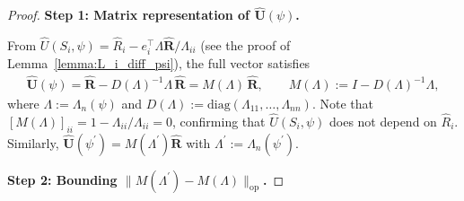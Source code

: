 \begin{proof}
\noindent\textbf{Step 1: Matrix representation of $\widehat{\mathbf{U}}(\psi)$.}

From $\widehat U(S_i,\psi)=\widehat R_i - e_i^\top\Lambda\widehat{\mathbf{R}}/\Lambda_{ii}$ (see the proof of Lemma~\ref{lemma:L_i_diff_psi}), the full vector satisfies
\begin{align*}
\widehat{\mathbf{U}}(\psi) = \widehat{\mathbf{R}} - D(\Lambda)^{-1}\Lambda\,\widehat{\mathbf{R}} = M(\Lambda)\,\widehat{\mathbf{R}},
\qquad M(\Lambda):=I - D(\Lambda)^{-1}\Lambda,
\end{align*}
where $\Lambda:=\Lambda_n(\psi)$ and $D(\Lambda):=\mathrm{diag}(\Lambda_{11},\ldots,\Lambda_{nn})$.  Note that $[M(\Lambda)]_{ii}=1-\Lambda_{ii}/\Lambda_{ii}=0$, confirming that $\widehat U(S_i,\psi)$ does not depend on $\widehat{R}_i$.  Similarly, $\widehat{\mathbf{U}}(\psi^\prime)=M(\Lambda^\prime)\widehat{\mathbf{R}}$ with $\Lambda^\prime:=\Lambda_n(\psi^\prime)$.

\noindent\textbf{Step 2: Bounding $\|M(\Lambda^\prime)-M(\Lambda)\|_{\mathrm{op}}$.}


\end{proof}
